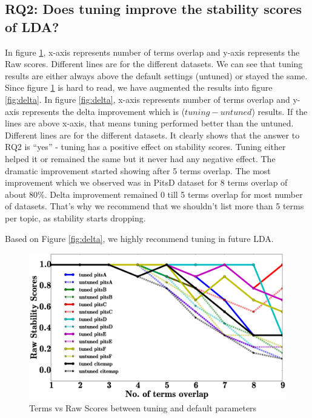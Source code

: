 \documentclass[conference]{IEEEtran}
\theoremstyle{break}
\begin{document}
\subsection{\textbf{RQ2: Does tuning improve the stability scores of LDA?}}

In figure \ref{fig:raw}, x-axis represents number of terms overlap and y-axis represents the Raw scores. Different lines are for the different datasets. We can see that tuning results are either always above the default settings (untuned) or stayed the same. Since figure \ref{fig:raw} is hard to read, we have augmented the results into figure \ref{fig:delta}. In figure \ref{fig:delta}, x-axis represents number of terms overlap and y-axis represents the delta improvement which is ($tuning - untuned$) results. If the lines are above x-axis, that means tuning performed better than the untuned. Different lines are for the different datasets. It clearly shows that the answer to RQ2 is “yes” - tuning has a positive effect on stability scores. Tuning either helped it or remained the same but it never had any negative effect. The dramatic improvement started showing after 5 terms overlap. The most improvement which we observed was in PitsD dataset for 8 terms overlap of about 80\%. Delta improvement remained 0 till 5 terms overlap for most number of datasets. That's why we recommend that we shouldn't list more than 5 terms per topic, as stability starts dropping.

\begin{lesson}
Based on Figure \ref{fig:delta}, we highly recommend tuning in future LDA.
\end{lesson}

\begin{center}
\begin{figure}[!htb]
  \includegraphics[width=\linewidth]{./fig/raw_graph.eps}
  \caption{Terms vs Raw Scores between tuning and default parameters}
  \label{fig:raw}
\end{figure}
\end{center}
\end{document}

